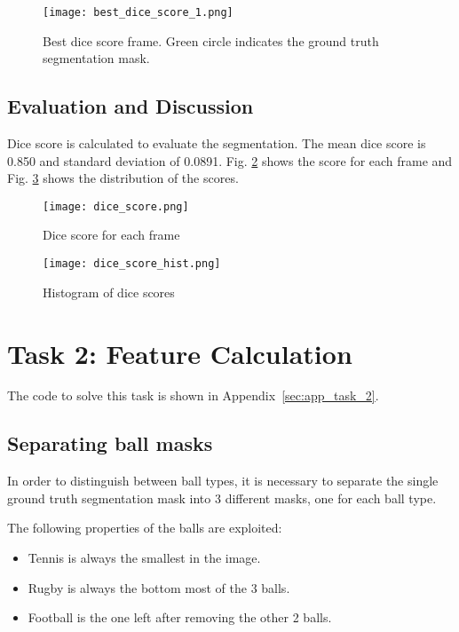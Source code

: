 \documentclass{report}
\begin{document}
\begin{figure}[ht]
    \centering
    \texttt{[image: best\_dice\_score\_1.png]}
    \caption{Best dice score frame. Green circle indicates the ground truth segmentation mask.}
    \label{fig:best_dice_score_1}
\end{figure}

\section{Evaluation and Discussion}

Dice score is calculated to evaluate the segmentation. The mean dice score is 0.850 and standard deviation of 0.0891. Fig. \ref{fig:dice_score} shows the score for each frame and Fig. \ref{fig:dice_score_hist} shows the distribution of the scores.

\begin{figure}[ht]
    \centering
    \texttt{[image: dice\_score.png]}
    \caption{Dice score for each frame}
    \label{fig:dice_score}
\end{figure}

\begin{figure}[ht]
    \centering
    \texttt{[image: dice\_score\_hist.png]}
    \caption{Histogram of dice scores}
    \label{fig:dice_score_hist}
\end{figure}

\chapter*{Task 2: Feature Calculation}

The code to solve this task is shown in Appendix~\ref{sec:app_task_2}.

\section{Separating ball masks}

In order to distinguish between ball types, it is necessary to separate the single ground truth segmentation mask into 3 different masks, one for each ball type.

The following properties of the balls are exploited:

\begin{itemize}
    \item Tennis is always the smallest in the image.
    \item Rugby is always the bottom most of the 3 balls.
    \item Football is the one left after removing the other 2 balls.
\end{itemize}
\end{document}
